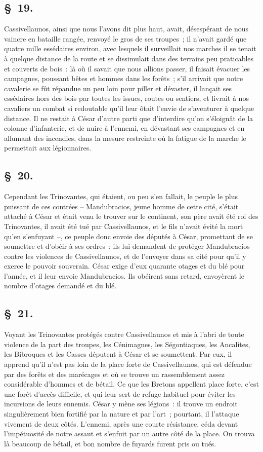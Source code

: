 \documentclass[french,twoside]{book} %
\begin{document}
\subsection[{§ 19.}]{ \textsc{§ 19.} }
\noindent Cassivellaunos, ainsi que nous l’avons dit plus haut, avait, désespérant de nous vaincre en bataille rangée, renvoyé le gros de ses troupes ; il n’avait gardé que quatre mille essédaires environ, avec lesquels il surveillait nos marches il se tenait à quelque distance de la route et se dissimulait dans des terrains peu praticables et couverts de bois : là où il savait que nous allions passer, il faisait évacuer les campagnes, poussant bêtes et hommes dans les forêts ; s’il arrivait que notre cavalerie se fût répandue un peu loin pour piller et dévaster, il lançait ses essédaires hors des bois par toutes les issues, routes ou sentiers, et livrait à nos cavaliers un combat si redoutable qu’il leur ôtait l’envie de s’aventurer à quelque distance. Il ne restait à César d’autre parti que d’interdire qu’on s’éloignât de la colonne d’infanterie, et de nuire à l’ennemi, en dévastant ses campagnes et en allumant des incendies, dans la mesure restreinte où la fatigue de la marche le permettait aux légionnaires.
\subsection[{§ 20.}]{ \textsc{§ 20.} }
\noindent Cependant les Trinovantes, qui étaient, ou peu s’en fallait, le peuple le plus puissant de ces contrées – Mandubracios, jeune homme de cette cité, s’était attaché à César et était venu le trouver sur le continent, son père avait été roi des Trinovantes, il avait été tué par Cassivellaunos, et le fils n’avait évité la mort qu’en s’enfuyant –, ce peuple donc envoie des députés à César, promettant de se soumettre et d’obéir à ses ordres ; ils lui demandent de protéger Mandubracios contre les violences de Cassivellaunos, et de l’envoyer dans sa cité pour qu’il y exerce le pouvoir souverain. César exige d’eux quarante otages et du blé pour l’année, et il leur envoie Mandubracios. Ils obéirent sans retard, envoyèrent le nombre d’otages demandé et du blé.
\subsection[{§ 21.}]{ \textsc{§ 21.} }
\noindent Voyant les Trinovantes protégés contre Cassivellaunos et mis à l’abri de toute violence de la part des troupes, les Cénimagnes, les Ségontiaques, les Ancalites, les Bibroques et les Casses députent à César et se soumettent. Par eux, il apprend qu’il n’est pas loin de la place forte de Cassivellaunos, qui est défendue par des forêts et des marécages et où se trouve un rassemblement assez considérable d’hommes et de bétail. Ce que les Bretons appellent place forte, c’est une forêt d’accès difficile, et qui leur sert de refuge habituel pour éviter les incursions de leurs ennemis. César y mène ses légions : il trouve un endroit singulièrement bien fortifié par la nature et par l’art ; pourtant, il l’attaque vivement de deux côtés. L'ennemi, après une courte résistance, céda devant l’impétuosité de notre assaut et s’enfuit par un autre côté de la place. On trouva là beaucoup de bétail, et bon nombre de fuyards furent pris ou tués.
\end{document}
